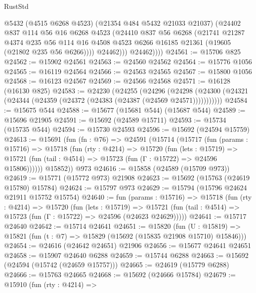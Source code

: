 \begin{lexlean}{RustStd}
\begin{coremodule}
                @5432
                (@4515 @6268 @4523)
                (@21354 @484 @5432 @21033 @21037)
                (@24402
                  @837
                  @114
                  @56
                  @16
                  @6268
                  @4523
                  (@24410
                    @837
                    @56
                    @6268
                    (@21741
                      @21287
                      @4374
                      @235
                      @56
                      @114
                      @16
                      @4508
                      @4523
                      @6266
                      @16185
                      @21361
                      (@19605 (@21802 @235 @56 @6266))))
                  @24462)))
            @24462))))
@24561 := @15706 @825
@24562 := @15902 @24561
@24563 := @24560 @24562
@24564 := @15776 @1056
@24565 := @16119 @24564
@24566 := @24563 @24565
@24567 := @15800 @1056
@24568 := @16123 @24567
@24569 := @24566 @24568
@24571 := @16128 (@16130 @825)
@24583 := @24230
    (@24255
      (@24296
        (@24298 (@24300 (@24321 (@24344 (@24359 (@24372 (@24383 (@24387 (@24569 @24571)))))))))))
@24584 := @15675 @544
@24588 := @15677 (@15681 @544) (@15687 @544)
@24589 := @15696 @21905
@24591 := @15692 (@24589 @15711)
@24593 := @15734 (@15735 @544)
@24594 := @15730 @24593
@24596 := @15692 (@24594 @15759)
@24613 := @15691
    (fun (fn : @76) =>
    @24591
      (@15714
        (@15717
          (fun (params : @15716) =>
          @15718
            (fun (rty : @4214) =>
            @15720
              (fun (lets : @15719) =>
              @15721 (fun (tail : @4514) => @15723 (fun (Γ : @15722) => @24596 @15806))))))
        @15852))
    @973
@24616 := @15858 (@24589 (@15709 @973))
@24619 := @15771 (@15772 @973) @21908
@24623 := @15692 (@15763 (@24619 @15780) @15784)
@24624 := @15797 @973
@24629 := @15794 (@15796 @24624 @21911 @15752 @15754)
@24640 := fun (params : @15716) =>
  @15718
    (fun (rty : @4214) =>
    @15720
      (fun (lets : @15719) =>
      @15721 (fun (tail : @4514) => @15723 (fun (Γ : @15722) => @24596 (@24623 @24629)))))
@24641 := @15717 @24640
@24642 := @15714 @24641
@24651 := @15820
    (fun (U : @15819) => @15821 (fun (t : @7) => @15829 (@15692 (@15835 @21908 @15710) @15846)))
@24654 := @24616 (@24642 @24651) @21906
@24656 := @15677 @24641 @24651
@24658 := @15907 @24640 @6288
@24659 := @15744 @6288
@24663 := @15692 (@24594 (@15742 (@24659 @15757)))
@24665 := @24619 (@15779 @6288)
@24666 := @15763 @24665
@24668 := @15692 (@24666 @15784)
@24679 := @15910
    (fun (rty : @4214) =>

\end{coremodule}
\end{lexlean}
